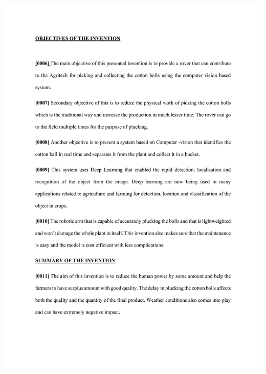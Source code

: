 \documentclass[12pt,a4paper]{report}
\begin{document}
\includegraphics[scale =0.7]{images/patent/patent_doc/output-0001.jpg}
\newpage
\end{document}
